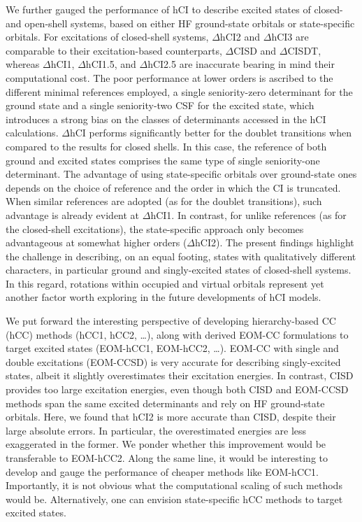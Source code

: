\documentclass[aip,jcp,reprint,noshowkeys,superscriptaddress]{revtex4-1}
\begin{document}
We further gauged the performance of hCI to describe excited states of closed- and open-shell systems, based on either HF ground-state orbitals or state-specific orbitals.
For excitations of closed-shell systems, $\Delta$hCI2 and $\Delta$hCI3 are comparable to their excitation-based counterparts, $\Delta$CISD and $\Delta$CISDT,
whereas $\Delta$hCI1, $\Delta$hCI1.5, and $\Delta$hCI2.5 are inaccurate bearing in mind their computational cost.
The poor performance at lower orders is ascribed to the different minimal references employed,
a single seniority-zero determinant for the ground state and a single seniority-two CSF for the excited state,
which introduces a strong bias on the classes of determinants accessed in the hCI calculations.
$\Delta$hCI performs significantly better for the doublet transitions when compared to the results for closed shells.
In this case, the reference of both ground and excited states comprises the same type of single seniority-one determinant.
The advantage of using state-specific orbitals over ground-state ones depends on the choice of reference and the order in which the CI is truncated.
When similar references are adopted (as for the doublet transitions), such advantage is already evident at $\Delta$hCI1.
In contrast, for unlike references (as for the closed-shell excitations), the state-specific approach only becomes advantageous at somewhat higher orders ($\Delta$hCI2).
The present findings highlight the challenge in describing, on an equal footing, states with qualitatively different characters, in particular ground and singly-excited states of closed-shell systems.
In this regard, rotations within occupied and virtual orbitals represent yet another factor worth exploring in the future developments of hCI models.

We put forward the interesting perspective of developing hierarchy-based CC (hCC) methods (hCC1, hCC2, \ldots),
along with derived EOM-CC formulations to target excited states (EOM-hCC1, EOM-hCC2, \ldots).
EOM-CC with single and double excitations (EOM-CCSD) \cite{Rowe_1968,Monkhorst_1977,Koch_1990,Stanton_1993}
is very accurate for describing singly-excited states, \cite{Loos_2018,Loos_2020,Loos_2020a} albeit it slightly overestimates their excitation energies.
In contrast, CISD provides too large excitation energies, \cite{Koch_1990,Kossoski_2023}
even though both CISD and EOM-CCSD methods span the same excited determinants and rely on HF ground-state orbitals.
Here, we found that hCI2 is more accurate than CISD, despite their large absolute errors. In particular, the overestimated energies are less exaggerated in the former.
We ponder whether this improvement would be transferable to EOM-hCC2.
Along the same line, it would be interesting to develop and gauge the performance of cheaper methods like EOM-hCC1.
Importantly, it is not obvious what the computational scaling of such methods would be.
Alternatively, one can envision state-specific hCC methods to target excited states.
\end{document}
